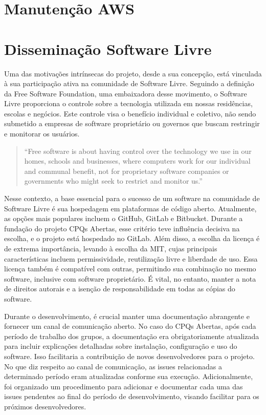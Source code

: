 \section{Manutenção AWS}

\section{Disseminação Software Livre}
Uma das motivações intrínsecas do projeto, desde a sua concepção, está vinculada à sua participação ativa na comunidade de Software Livre. Seguindo a definição da Free Software Foundation, uma embaixadora desse movimento, o Software Livre proporciona o controle sobre a tecnologia utilizada em nossas residências, escolas e negócios. Este controle visa o benefício individual e coletivo, não sendo submetido a empresas de software proprietário ou governos que buscam restringir e monitorar os usuários.
    
    \begin{quote}
     \enquote{Free software is about having control over the technology we use in our homes, schools and businesses, where computers work for our individual and communal benefit, not for proprietary software companies or governments who might seek to restrict and monitor us.}
    \end{quote}

Nesse contexto, a base essencial para o sucesso de um software na comunidade de Software Livre é sua hospedagem em plataformas de código aberto. Atualmente, as opções mais populares incluem o GitHub, GitLab e Bitbucket. Durante a fundação do projeto CPQs Abertas, esse critério teve influência decisiva na escolha, e o projeto está hospedado no GitLab. Além disso, a escolha da licença é de extrema importância, levando à escolha da MIT, cujas principais características incluem permissividade, reutilização livre e liberdade de uso. Essa licença também é compatível com outras, permitindo sua combinação no mesmo software, inclusive com software proprietário. É vital, no entanto, manter a nota de direitos autorais e a isenção de responsabilidade em todas as cópias do software.

Durante o desenvolvimento, é crucial manter uma documentação abrangente e fornecer um canal de comunicação aberto. No caso do CPQs Abertas, após cada período de trabalho dos grupos, a documentação era obrigatoriamente atualizada para incluir explicações detalhadas sobre instalação, configuração e uso do software. Isso facilitaria a contribuição de novos desenvolvedores para o projeto. No que diz respeito ao canal de comunicação, as issues relacionadas a determinado período eram atualizadas conforme sua execução. Adicionalmente, foi organizado um procedimento para adicionar e documentar cada uma das issues pendentes ao final do período de desenvolvimento, visando facilitar para os próximos desenvolvedores.

